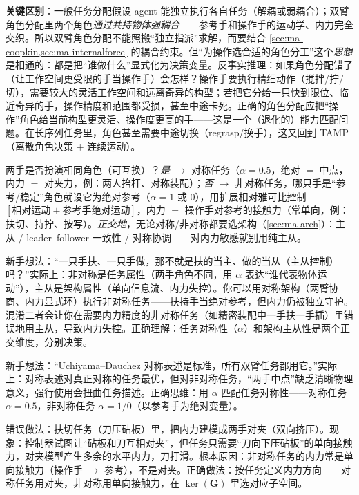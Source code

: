 \noindent\textbf{关键区别}：一般任务分配假设 agent 能独立执行各自任务（解耦或弱耦合）；双臂角色分配里两个角色\emph{通过共持物体强耦合}——参考手和操作手的运动学、内力完全交织。所以双臂角色分配不能照搬“独立指派”求解，而要结合 \cref{sec:ma-coopkin,sec:ma-internalforce} 的耦合约束。但“为操作选合适的角色分工”这个\emph{思想}是相通的：都是把“谁做什么”显式化为决策变量。反事实推理：如果角色分配错了（让工作空间更受限的手当操作手）会怎样？操作手要执行精细动作（搅拌/拧/切），需要较大的灵活工作空间和远离奇异的构型；若把它分给一只快到限位、临近奇异的手，操作精度和范围都受损，甚至中途卡死。正确的角色分配应把“操作”角色给当前构型更灵活、操作度更高的手——这是一个（退化的）能力匹配问题。在长序列任务里，角色甚至需要中途切换（regrasp/换手），这又回到 TAMP（离散角色决策 $+$ 连续运动）。

\begin{insight}[对称/非对称选型决策树]
两手是否扮演相同角色（可互换）？\emph{是} $\to$ 对称任务（$\alpha=0.5$，绝对 $=$ 中点，内力 $=$ 对夹力，例：两人抬杆、对称装配）；\emph{否} $\to$ 非对称任务，哪只手是“参考/稳定”角色就设它为绝对参考（$\alpha=1$ 或 $0$），用扩展相对雅可比控制 $[\text{相对运动}+\text{参考手绝对运动}]$，内力 $=$ 操作手对参考的接触力（常单向，例：扶切、持拧、按写）。\emph{正交地}，无论对称/非对称都要选架构（\cref{sec:ma-arch}）：主从 / leader--follower 一致性 / 对称协调——对内力敏感就别用纯主从。
\end{insight}

\begin{pitfall}
新手想法：“一只手扶、一只手做，那不就是扶的当主、做的当从（主从控制）吗？”实际上：非对称是任务属性（两手角色不同，用 $\alpha$ 表达“谁代表物体运动”），主从是架构属性（单向信息流、内力失控）。你可以用对称架构（两臂协商、内力显式环）执行非对称任务——扶持手当绝对参考，但内力仍被独立守护。混淆二者会让你在需要内力精度的非对称任务（如精密装配中一手扶一手插）里错误地用主从，导致内力失控。正确理解：任务对称性（$\alpha$）和架构主从性是两个正交维度，分别决策。
\end{pitfall}

\begin{pitfall}[思维陷阱：对称表述（绝对 $=$ 中点）适用于所有任务]
新手想法：“Uchiyama--Dauchez 对称表述是标准，所有双臂任务都用它。”实际上：对称表述对真正对称的任务最优，但对非对称任务，“两手中点”缺乏清晰物理意义，强行使用会扭曲任务描述。正确思维：用 $\alpha$ 匹配任务对称性——对称任务 $\alpha=0.5$，非对称任务 $\alpha=1/0$（以参考手为绝对变量）。
\end{pitfall}

\begin{pitfall}
错误做法：扶切任务（刀压砧板）里，把内力建模成两手对夹（双向挤压）。现象：控制器试图让“砧板和刀互相对夹”，但任务只需要“刀向下压砧板”的单向接触力，对夹模型产生多余的水平内力，刀打滑。根本原因：非对称任务的内力常是单向接触力（操作手 $\to$ 参考），不是对夹。正确做法：按任务定义内力方向——对称任务用对夹，非对称用单向接触力，在 $\ker(\mathbf{G})$ 里选对应子空间。
\end{pitfall}

